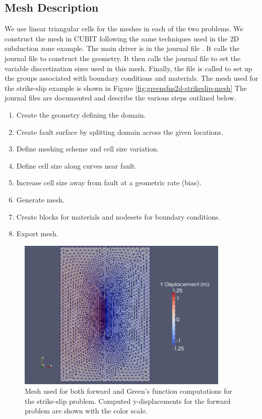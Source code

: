 \subsection{Mesh Description}

We use linear triangular cells for the meshes in each of the two
problems.  We construct the mesh in CUBIT following the same
techniques used in the 2D subduction zone example. The main driver is
in the journal file . It calls the journal
file  to construct the geometry. It then calls
the journal file  to set the variable
discretization sizes used in this mesh. Finally, the
 file is called to set up the groups associated
with boundary conditions and materials. The mesh used for the
strike-slip example is shown in Figure
\vref{fig:greensfns2d-strikeslip-mesh} The journal files are
documented and describe the various steps outlined below.

\begin{enumerate}
\item Create the geometry defining the domain.
\item Create fault surface by splitting domain across the given locations.
\item Define meshing scheme and cell size variation.
\item Define cell size along curves near fault.
\item Increase cell size away from fault at a geometric rate (bias).
\item Generate mesh.
\item Create blocks for materials and nodesets for boundary conditions.
\item Export mesh.
\end{enumerate}

\begin{figure}
  \includegraphics[width=4in]{examples/figs/greensfns2d_strikeslip_ydispl2}
  \caption{Mesh used for both forward and Green's function computations for the
    strike-slip problem. Computed y-displacements for the forward problem
    are shown with the color scale.}
  \label{fig:greensfns2d-strikeslip-mesh}
\end{figure}


